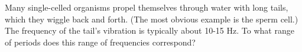Many single-celled organisms propel themselves through
water with long tails, which they wiggle back and forth.
(The most obvious example is the sperm cell.) The frequency
of the tail's vibration is typically about 10-15 Hz. To what
range of periods does this range of frequencies correspond?

